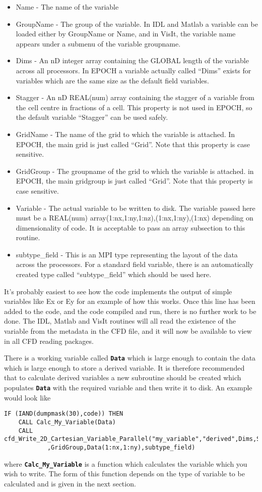 \documentclass[12pt]{article}
\newcommand{\simpleboxverbatim}{\begin{Verbatim}[obeytabs=true,frame=single,
  framerule=0.5mm,rulecolor=\color{warwickmid}]}
\newcommand{\inlinecode}[1]{{\color{warwickred} \bf\texttt{#1}}}
\newcommand{\nEPOCH}{{\color{warwickdark}\fontfamily{phv}\selectfont EPOCH}}
\newcommand{\EPOCH}{{\nEPOCH} }
\begin{document}
\begin{itemize}
\item Name - The name of the variable
\item GroupName - The group of the variable. In IDL and Matlab a variable can
  be loaded either by GroupName or Name, and in VisIt, the variable name
  appears under a submenu of the variable groupname.
\item Dims - An nD integer array containing the GLOBAL length of the variable
  across all processors. In \EPOCH a variable actually called ``Dims'' exists
  for variables which are the same size as the default field variables.
\item Stagger - An nD REAL(num) array containing the stagger of a variable from
  the cell centre in fractions of a cell. This property is not used in EPOCH,
  so the default variable ``Stagger'' can be used safely.
\item GridName - The name of the grid to which the variable is attached. In
  EPOCH, the main grid is just called ``Grid''. Note that this property is case
  sensitive.
\item GridGroup - The groupname of the grid to which the variable is
  attached. in EPOCH, the main gridgroup is just called ``Grid''. Note that
  this property is case sensitive.
\item Variable - The actual variable to be written to disk. The variable passed
  here must be a REAL(num) array(1:nx,1:ny,1:nz),(1:nx,1:ny),(1:nx) depending
  on dimensionality of code. It is acceptable to pass an array subsection to
  this routine.
\item subtype\_field - This is an MPI type representing the layout of the data
  across the processors. For a standard field variable, there is an
  automatically created type called ``subtype\_field'' which should be used
  here.
\end{itemize}

It's probably easiest to see how the code implements the output of simple
variables like Ex or Ey for an example of how this works. Once this line has
been added to the code, and the code compiled and run, there is no further work
to be done. The IDL, Matlab and VisIt routines will all read the existence of
the variable from the metadata in the CFD file, and it will now be available to
view in all CFD reading packages.

There is a working variable called \inlinecode{Data} which is large enough to
contain the data which is large enough to store a derived variable. It is
therefore recommended that to calculate derived variables a new subroutine
should be created which populates \inlinecode{Data} with the required variable
and then write it to disk. An example would look like
\simpleboxverbatim
IF (IAND(dumpmask(30),code)) THEN
	CALL Calc_My_Variable(Data)
	CALL cfd_Write_2D_Cartesian_Variable_Parallel("my_variable","derived",Dims,Stagger,GridName&
            ,GridGroup,Data(1:nx,1:ny),subtype_field)
\end{Verbatim}
where \inlinecode{Calc\_My\_Variable} is a function which calculates the
variable which you wish to write. The form of this function depends on the type
of variable to be calculated and is given in the next section.
\end{document}
